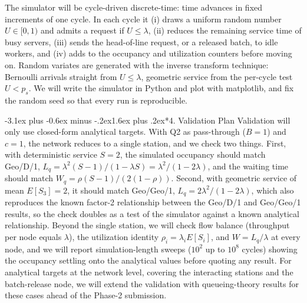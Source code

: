 \documentclass[11pt,a4paper]{article}
\makeatletter
\renewcommand\section{\@startsection{section}{1}{\z@}%
  {-3.1ex plus -0.6ex minus -.2ex}{1.6ex plus .2ex}{\normalfont\Large\bfseries}}
\makeatother
\begin{document}
The simulator will be cycle-driven discrete-time: time advances in fixed increments
of one cycle. In each cycle it (i) draws a uniform random number $U \in [0,1)$ and
admits a request if $U \le \lambda$, (ii) reduces the remaining service time of
busy servers, (iii) sends the head-of-line request, or a released batch, to idle
workers, and (iv) adds to the occupancy and utilization counters before moving on.
Random variates are generated with the inverse transform technique: Bernoulli
arrivals straight from $U \le \lambda$, geometric service from the per-cycle test
$U < p_s$. We will write the simulator in Python and plot with matplotlib, and fix
the random seed so that every run is reproducible.

\section*{4. Validation Plan}
Validation will only use closed-form analytical targets. With Q2 as pass-through
($B=1$) and $c=1$, the network reduces to a single station, and we check two
things. First, with deterministic service $S=2$, the simulated occupancy should
match Geo/D/1, $L_q = \lambda^2 (S-1)/(1-\lambda S) = \lambda^2/(1-2\lambda)$, and
the waiting time should match $W_q = \rho(S-1)/(2(1-\rho))$. Second, with
geometric service of mean $E[S_3]=2$, it should match Geo/Geo/1,
$L_q = 2\lambda^2/(1-2\lambda)$, which also reproduces the known factor-2
relationship between the Geo/D/1 and Geo/Geo/1 results, so the check doubles as a
test of the simulator against a known analytical relationship. Beyond the single
station, we will check flow balance (throughput per node equals $\lambda$), the
utilization identity $\rho_i = \lambda_i E[S_i]$, and $W = L_q/\lambda$ at every
node, and we will report simulation-length sweeps ($10^2$ up to $10^8$ cycles)
showing the occupancy settling onto the analytical values before quoting any
result. For analytical targets at the network level, covering the interacting
stations and the batch-release node, we will extend the validation with
queueing-theory results for these cases ahead of the Phase-2 submission.
\end{document}
